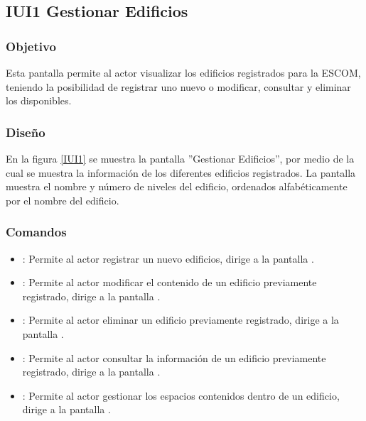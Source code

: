 \subsection{IUI1 Gestionar Edificios}

\subsubsection{Objetivo}
	
	Esta pantalla permite al actor visualizar los edificios registrados para la ESCOM, teniendo la posibilidad de registrar uno nuevo o modificar, consultar y eliminar los disponibles.

\subsubsection{Diseño}

    En la figura \ref{IUI1} se muestra la pantalla ''Gestionar Edificios'', por medio de la cual se muestra la información de los diferentes edificios registrados. La pantalla muestra el nombre y número de niveles del edificio, ordenados alfabéticamente por el nombre del edificio.
 

\subsubsection{Comandos}
    \begin{itemize}
	\item \btnRegistrar: Permite al actor registrar un nuevo edificios, dirige a la pantalla .
	
	\item {}: Permite al actor modificar el contenido de un edificio previamente registrado, dirige a la pantalla .
	
	\item {}: Permite al actor eliminar un edificio previamente registrado, dirige a la pantalla .
	
	\item {}: Permite al actor consultar la información de un edificio previamente registrado, dirige a la pantalla .
	
	\item {}: Permite al actor gestionar los espacios contenidos dentro de un edificio, dirige a la pantalla .
    \end{itemize}
